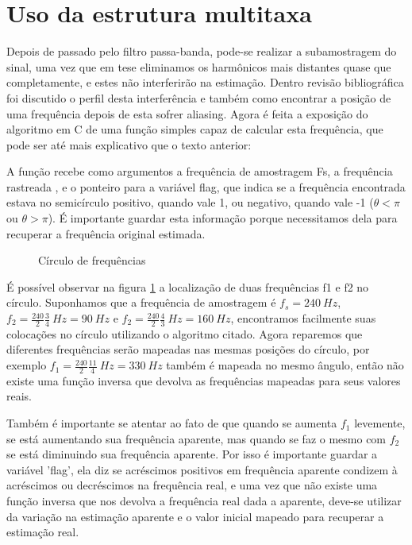 \section{Uso da estrutura multitaxa}

Depois de passado pelo filtro passa-banda, pode-se realizar a subamostragem do sinal, uma vez que em tese eliminamos os harmônicos mais distantes quase que completamente, e estes não interferirão na estimação. Dentro revisão bibliográfica foi discutido o perfil desta interferência e também como encontrar a posição de uma frequência depois de esta sofrer aliasing. Agora é feita a exposição do algoritmo em C de uma função simples capaz de calcular esta frequência, que pode ser até mais explicativo que o texto anterior:



A função recebe como argumentos a frequência de amostragem Fs, a frequência rastreada , e o ponteiro para a variável flag, que indica se a frequência encontrada estava no semicírculo positivo, quando vale 1, ou negativo, quando vale -1 ($\theta<\pi$ ou $\theta>\pi$). É importante guardar esta informação porque necessitamos dela para recuperar a frequência original estimada. 

\begin{figure}[h]
	\centering    
	\def\svgwidth{\columnwidth}
	
	\caption{Círculo de frequências}
	\label{fig:freq_circ}
\end{figure}

\indent É possível observar na figura \ref{fig:freq_circ} a localização de duas frequências f1 e f2 no círculo. Suponhamos que a frequência de amostragem é $f_s=240 \:Hz$, $f_2=\frac{240}{2} \frac{3}{4} \: Hz = 90 \: Hz$ e $f_2=\frac{240}{2} \frac{4}{3} \: Hz = 160 \: Hz$, encontramos facilmente suas colocações no círculo utilizando o algoritmo citado. Agora reparemos que diferentes frequências serão mapeadas nas mesmas posições do círculo, por exemplo $f_1=\frac{240}{2} \frac{11}{4} \: Hz = 330 \: Hz$ também é mapeada no mesmo ângulo, então não existe uma função inversa que devolva as frequências mapeadas para seus valores reais. 

\indent Também é importante se atentar ao fato de que quando se aumenta $f_1$ levemente, se está aumentando sua frequência aparente, mas quando se faz o mesmo com $f_2$ se está diminuindo sua frequência aparente. Por isso é importante guardar a variável 'flag', ela diz se acréscimos positivos em frequência aparente condizem à acréscimos ou decréscimos na frequência real, e uma vez que não existe uma função inversa que nos devolva a frequência real dada a aparente, deve-se utilizar da variação na estimação aparente e o valor inicial mapeado para recuperar a estimação real.

